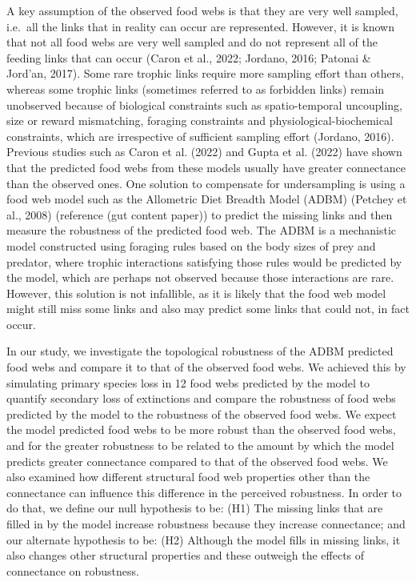 \documentclass{article}
\begin{document}
A key assumption of the observed food webs is that they are very well
sampled, i.e.~all the links that in reality can occur are represented.
However, it is known that not all food webs are very well sampled and do
not represent all of the feeding links that can occur (Caron et al.,
2022; Jordano, 2016; Patonai \& Jord'an, 2017). Some rare trophic links
require more sampling effort than others, whereas some trophic links
(sometimes referred to as forbidden links) remain unobserved because of
biological constraints such as spatio-temporal uncoupling, size or
reward mismatching, foraging constraints and physiological-biochemical
constraints, which are irrespective of sufficient sampling effort
(Jordano, 2016). Previous studies such as Caron et al. (2022) and Gupta
et al. (2022) have shown that the predicted food webs from these models
usually have greater connectance than the observed ones. One solution to
compensate for undersampling is using a food web model such as the
Allometric Diet Breadth Model (ADBM) (Petchey et al., 2008) (reference
(gut content paper)) to predict the missing links and then measure the
robustness of the predicted food web. The ADBM is a mechanistic model
constructed using foraging rules based on the body sizes of prey and
predator, where trophic interactions satisfying those rules would be
predicted by the model, which are perhaps not observed because those
interactions are rare. However, this solution is not infallible, as it
is likely that the food web model might still miss some links and also
may predict some links that could not, in fact occur.

In our study, we investigate the topological robustness of the ADBM
predicted food webs and compare it to that of the observed food webs. We
achieved this by simulating primary species loss in 12 food webs
predicted by the model to quantify secondary loss of extinctions and
compare the robustness of food webs predicted by the model to the
robustness of the observed food webs. We expect the model predicted food
webs to be more robust than the observed food webs, and for the greater
robustness to be related to the amount by which the model predicts
greater connectance compared to that of the observed food webs. We also
examined how different structural food web properties other than the
connectance can influence this difference in the perceived robustness.
In order to do that, we define our null hypothesis to be: (H1) The
missing links that are filled in by the model increase robustness
because they increase connectance; and our alternate hypothesis to be:
(H2) Although the model fills in missing links, it also changes other
structural properties and these outweigh the effects of connectance on
robustness.
\end{document}
